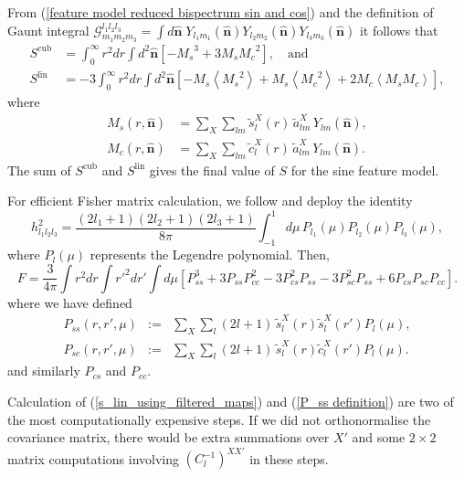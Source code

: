 From (\ref{feature model reduced bispectrum sin and cos}) and the definition of Gaunt integral $\mathcal{G}^{l_1 l_2 l_3}_{m_1 m_2 m_3} = \int d\hat{\mathbf{n}} \; Y_{l_1 m_1}(\hat{\mathbf{n}}) Y_{l_2 m_2}(\hat{\mathbf{n}}) Y_{l_3 m_3}(\hat{\mathbf{n}})$ it follows that
\begin{align}
	S^\text{cub} &= \int_0^\infty r^2 dr \int d^2\hat{\mathbf{n}} \left[ - {M_s}^3 + 3 M_s {M_c}^2 \right], \quad\text{and} \\
	S^\text{lin} &= -3 \int_0^\infty r^2 dr \int d^2\hat{\mathbf{n}} \left[ - {M_s} \left<{M_s}^2\right> + M_s \left< {M_c}^2 \right> + 2 {M_c} \left< {M_s} {M_c} \right> \right], \label{s_lin_using_filtered_maps}
\end{align}
where
\begin{align}
	M_s(r, \hat{\mathbf{n}}) &= \sum_X \sum_{l m} \tilde{s}_l^X(r) \, \tilde{a}_{lm}^X \, Y_{lm}(\hat{\mathbf{n}}), \\
	M_c(r, \hat{\mathbf{n}}) &= \sum_X \sum_{l m} \tilde{c}_l^X(r) \, \tilde{a}_{lm}^X \, Y_{lm}(\hat{\mathbf{n}}).
	\label{M_s definition}
\end{align}
The sum of $S^\text{cub}$ and $S^\text{lin}$ gives the final value of $S$ for the sine feature model.

For efficient Fisher matrix calculation, we follow \cite{Smith2011} and deploy the identity
\begin{equation}
	h_{l_1 l_2 l_3} ^2 = \frac{(2l_1 +1)(2l_2 +1)(2l_3 +1)}{8\pi} \int_{-1}^{1} d\mu \, P_{l_1}(\mu)P_{l_2}(\mu)P_{l_3}(\mu), \label{h}
\end{equation}
where $P_{l}(\mu)$ represents the Legendre polynomial. Then,
\begin{equation}
	F = \frac{3}{4\pi} \int r^2 dr \int r'^2 dr' \int d\mu \left[ P_{ss}^3 + 3 P_{ss} P_{cc}^2 - 3 P_{cs}^2 P_{ss} - 3 P_{sc}^2 P_{ss} + 6 P_{cs}P_{sc}P_{cc} \right].
\end{equation}
where we have defined
\begin{eqnarray}
	P_{ss}(r, r', \mu) &:=& \sum_{X} \sum_{l} (2l+1) \, \tilde{s}_l^X(r) \tilde{s}_l^X(r') P_l(\mu), \nonumber \\
	P_{sc}(r, r', \mu) &:=& \sum_{X} \sum_{l} (2l+1) \, \tilde{s}_l^X(r) \tilde{c}_l^X(r') P_l(\mu).
	\label{P_ss definition}
\end{eqnarray}
and similarly $P_{cs}$ and $P_{cc}$.

Calculation of (\ref{s_lin_using_filtered_maps}) and (\ref{P_ss definition}) are two of the most computationally expensive steps. If we did not orthonormalise the covariance matrix, there would be extra summations over $X'$ and some $2\times2$ matrix computations involving $(C_l^{-1})^{XX'}$ in these steps.


